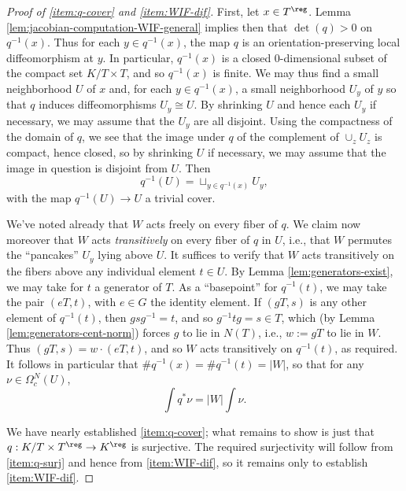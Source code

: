 \documentclass[reqno]{amsart} 
\begin{document}
\begin{proof}
[Proof of \ref{item:q-cover} and \ref{item:WIF-dif}]
  First, let $x \in T^{\reg}$.  Lemma \ref{lem:jacobian-computation-WIF-general} implies then that $\det(q) > 0$ on $q^{-1}(x)$.  Thus for each $y \in q^{-1}(x)$, the map $q$ is an orientation-preserving local diffeomorphism at $y$.  In particular, $q^{-1}(x)$ is a closed $0$-dimensional subset of the compact set $K/T \times T$, and so $q^{-1}(x)$ is finite.  We may thus find a small neighborhood $U$ of $x$ and, for each $y \in q^{-1}(x)$, a small neighborhood $U_y$ of $y$ so that $q$ induces diffeomorphisms $U_y \cong U$.  By shrinking $U$ and hence each $U_y$ if necessary, we may assume that the $U_y$ are all disjoint.  Using the compactness of the domain of $q$, we see that the image under $q$ of the complement of $\cup_z U_z$ is compact, hence closed, so by shrinking $U$ if necessary, we may assume that the image in question is disjoint from $U$.  Then
  \begin{equation*}
    q^{-1}(U) = \sqcup_{y \in q^{-1}(x)} U_y,
  \end{equation*}
  with the map $q^{-1}(U) \rightarrow U$ a trivial cover.

  We've noted already that $W$ acts freely on every fiber of $q$.  We claim now moreover that $W$ acts \emph{transitively} on every fiber of $q$ in $U$, i.e., that $W$ permutes the ``pancakes'' $U_y$ lying above $U$.  It suffices to verify that $W$ acts transitively on the fibers above any individual element $t \in U$.  By Lemma \ref{lem:generators-exist}, we may take for $t$ a generator of $T$.  As a ``basepoint'' for $q^{-1}(t)$, we may take the pair $(e T,t)$, with $e \in G$ the identity element.  If $(g T,s)$ is any other element of $q^{-1}(t)$, then $g s g^{-1} = t$, and so $g^{-1} t g = s \in T$, which (by Lemma \ref{lem:generators-cent-norm}) forces $g$ to lie in $N(T)$, i.e., $w := g T$ to lie in $W$.  Thus $(g T, s) = w \cdot (e T, t)$, and so $W$ acts transitively on $q^{-1}(t)$, as required.  It follows in particular that $\# q^{-1} (x) =\# q^{-1}(t) = |W|$, so that for any $\nu \in \Omega_c^N(U)$,
  \begin{equation}\label{eq:partial-WIF-good-U}
    \int q^* \nu = |W| \int \nu.
  \end{equation}

  We have nearly established \ref{item:q-cover}; what remains to show is just that $q : K/T \times T^{\reg} \rightarrow K^{\reg}$ is surjective.  The required surjectivity will follow from \ref{item:q-surj} and hence from \ref{item:WIF-dif}, so it remains only to establish \ref{item:WIF-dif}.
  

\end{proof}
\end{document}
